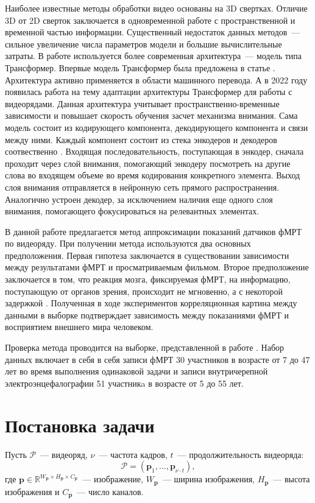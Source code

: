 \documentclass[12pt,twoside]{article}
\begin{document}
Наиболее известные методы обработки видео основаны на 3D свертках. 
Отличие 3D от 2D сверток заключается в одновременной работе с пространственной  
и временной частью информации. Существенный недостаток данных методов~--- 
сильное увеличение числа параметров модели и большие вычислительные затраты.
В работе используется более современная архитектура~--- модель типа Трансформер.
Впервые модель Трансформер была предложена в статье
\citep{https://doi.org/10.48550/arxiv.1706.03762}. Архитектура активно применяется в области машинного перевода.
А в 2022 году появилась работа \citep{transformer} на тему адаптации архитектуры Трансформер для работы с видеорядами. 
Данная архитектура учитывает пространственно-временные зависимости и повышает скорость обучения засчет механизма внимания.
Сама модель состоит из кодирующего компонента, декодирующего компонента и связи между ними. Каждый компонент состоит из стека 
энкодеров и декодеров соотвественно \citep{badrinarayanan2017segnet}. 
Входящая последовательность, поступающая в энкодер, сначала проходит через слой внимания, помогающий энкодеру 
посмотреть на другие слова во входящем объеме во время кодирования конкретного элемента. 
Выход слоя внимания отправляется в нейронную сеть прямого распространения. 
Аналогично устроен декодер, за исключением наличия еще одного слоя внимания, помогающего фокусироваться на релевантных элементах.

В данной работе предлагается метод аппроксимации показаний датчиков фМРТ по видеоряду. 
При получении метода используются два основных предположения. Первая гипотеза заключается в существовании зависимости между результатами фМРТ и просматриваемым фильмом.
Второе предположение заключается в том, что реакция мозга, фиксируемая фМРТ, на информацию, поступающую от органов зрения, происходит не мгновенно, а с некоторой задержкой \citep{Demidov}. 
Полученная в ходе экспериментов корреляционная картина между данными в выборке подтверждает 
зависимость между показаниями фМРТ и восприятием внешнего мира человеком. 

Проверка метода проводится на выборке, представленной в работе \citep{Berezutskaya2022}. 
Набор данных включает в себя в себя записи фМРТ 30 участников в возрасте от 7 до 47 лет во время 
выполнения одинаковой задачи и записи внутричерепной электроэнцефалографии 51 участникa в возрасте от 5 до 55 лет. 


\section{Постановка задачи}
Пусть $\bm{\mathcal{P}}$~--- видеоряд, $\nu$~--- частота кадров, $t$~--- продолжительность видеоряда:
\begin{equation}
    \bm{\mathcal{P}} = (\bm{p}_{1}, \dots, \bm{p}_{\nu \cdot t}),
\end{equation}
где $\bm{p} \in \mathbb{R}^{W_{\bm{p}} \times H_{\bm{p}} \times C_{\bm{p}}}$~--- изображение, $W_{\bm{p}}$~---
ширина изображения, $H_{\bm{p}}$~--- высота изображения и $C_{\bm{p}}$~--- число каналов.
\end{document}
